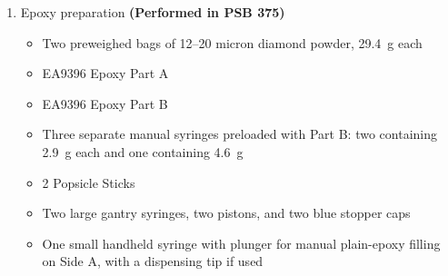 \documentclass[12pt]{cornelltfpxsop}
\begin{document}
\begin{enumerate}
\begin{itemize}[itemsep=0.5pt,parsep=0pt,topsep=4pt]
        \item PEEK Periphery
        \item EA9396 Epoxy  parts A and B. 
        \item Flower-Pattern Shape Titanium $CO_2$ tube/evaporator
        \item 0.063" Olive green Nordson fluid dispensing tip
        \item 0.033" Light green Nordson fluid dispensing tip
        \item Box with PEEK inserts (56 will be used)
        \item Tweezers
        \item Two bottom jig plates (with vacuum lines)
        \item One top jig plate
        \item Both 3D-printed pressing tools for seating the evaporator and inserts
        \item Flower-pattern cover piece for spreading epoxy on Side B
        \item Plastic scraper for spreading doped epoxy over Side B
        \item Small scraping tool/spatula for clearing epoxy from the filling holes
        \item Neodymium magnets for securing CFF Half-Dee to Jig plate
        \item Small soft paint brush
        \item Curing oven
        \item Painter's Tape
    \end{itemize}
\newpage
\item Epoxy preparation \textbf{(Performed in PSB 375)}
    \begin{itemize}[itemsep=0.5pt,parsep=0pt,topsep=4pt]
        \item Two preweighed bags of 12--20 micron diamond powder, 29.4~g each
        \item EA9396 Epoxy Part A
        \item EA9396 Epoxy Part B
        \item Three separate manual syringes preloaded with Part B: two containing 2.9~g each and one containing 4.6~g
        \item 2 Popsicle Sticks
        \item Two large gantry syringes, two pistons, and two blue stopper caps
        \item One small handheld syringe with plunger for manual plain-epoxy filling on Side A, with a dispensing tip if used

\end{itemize}
\end{enumerate}
\end{document}
